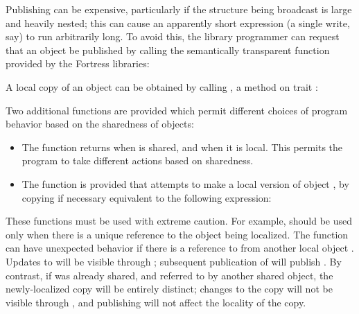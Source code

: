 Publishing can be expensive, particularly if the structure being
broadcast is large and heavily nested; this can cause an apparently
short  expression (a single write, say) to run arbitrarily
long.  To avoid this, the library programmer can request that an
object be published by calling the semantically transparent function
 provided by the Fortress libraries:

A local copy of an object can be obtained by calling , a
method on trait :

Two additional functions are provided which permit different choices of
program behavior based on the sharedness of objects:
\begin{itemize}
\item The function  returns  when
 is shared, and  when it is local.  This permits
the program to take different actions based on sharedness.
\item The function  is provided that attempts to make a local version of object , by copying if necessary
equivalent to the following expression:
\end{itemize}
These functions must be used with extreme caution.  For example,
 should be used only when there is a unique
reference to the object being localized.  The  function
can have unexpected behavior if there is a reference to  from
another local object .  Updates to  will be visible
through ; subsequent publication of  will publish
.  By contrast, if  was already shared, and referred to
by another shared object, the newly-localized copy will be entirely
distinct; changes to the copy will not be visible through , and
publishing  will not affect the locality of the copy.
